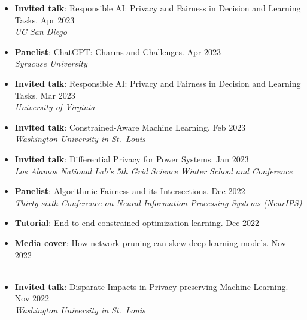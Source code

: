 \begin{itemize}
  \item {\bf Invited talk}: {Responsible AI: Privacy and Fairness in Decision and Learning Tasks.} \hfill{Apr 2023}\\
  {\em  UC San Diego}

  \item {\bf Panelist}: {ChatGPT: Charms and Challenges.} \hfill{Apr 2023}\\
  {\em  Syracuse University}

  \item {\bf Invited talk}: {Responsible AI: Privacy and Fairness in Decision and Learning Tasks.} \hfill{Mar 2023}\\
  {\em  University of Virginia}

  \item {\bf Invited talk}: {Constrained-Aware Machine Learning.} \hfill{Feb 2023}\\
  {\em  Washington University in St.~Louis}

  \item {\bf Invited talk}: {Differential Privacy for Power Systems.} \hfill{Jan 2023}\\
  {\em  Los Alamos National Lab's 5th Grid Science Winter School and Conference}

  \item {\bf Panelist}: {Algorithmic Fairness and its Intersections.} \hfill{Dec 2022}\\
  {\em Thirty-sixth Conference on Neural Information Processing Systems (NeurIPS)}

  \item {\bf Tutorial}: {End-to-end constrained optimization learning.} \hfill{Dec 2022}\\

  \item {\bf Media cover}: 
  {How network pruning can skew deep learning models.} \hfill {Nov 2022}\\ 
  ~
  ~
  ~

  \item {\bf Invited talk}: {Disparate Impacts in Privacy-preserving Machine Learning.} \hfill{Nov 2022}\\
  {\em Washington University in St.~Louis} 


\end{itemize}
